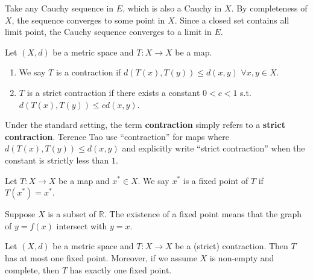 \begin{pfbox}

    Take any Cauchy sequence in $E$, which is also a Cauchy in $X$. By completeness of $X$, the sequence converges to some point in $X$. Since a closed set contains all limit point, the Cauchy sequence converges to a limit in $E$.

\end{pfbox}

\begin{definition}[Contraction]
Let $(X,d)$ be a metric space and $T: X \to X$ be a map.
\begin{enumerate}
    \item We say $T$ is a contraction if $d(T(x), T(y)) \le d(x,y)$ $\forall x, y \in X$.
    \item $T$ is a strict contraction if there exists a constant $0<c<1$ s.t. $d(T(x), T(y)) \le cd(x,y)$.
\end{enumerate}
\end{definition}

\begin{remark}
Under the standard setting, the term \textbf{contraction} simply refers to a \textbf{strict contraction}. Terence Tao use ``contraction'' for maps where $d(T(x), T(y)) \le d(x,y)$ and explicitly write ``strict contraction'' when the constant is strictly less than $1$.
\end{remark}

\begin{definition}
Let $T: X \to X$ be a map and $x^* \in X$. We say $x^*$ is a fixed point of $T$ if $T(x^*) = x^*$.
\end{definition}

\begin{remark}
Suppose $X$ is a subset of $\mathbb{R}$. The existence of a fixed point means that the graph of $y=f(x)$ intersect with $y=x$.
\end{remark}


\begin{theorem}
Let $(X,d)$ be a metric space and $T: X \to X$ be a (strict) contraction. Then $T$ has at most one fixed point. Moreover, if we assume $X$ is non-empty and complete, then $T$ has exactly one fixed point.
\end{theorem}

